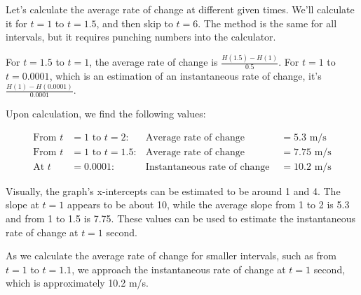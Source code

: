 \documentclass{article}
\begin{document}
\begin{itemize}
Let's calculate the average rate of change at different given times. We'll calculate it for \(t = 1\) to \(t = 1.5\), and then skip to \(t = 6\). The method is the same for all intervals, but it requires punching numbers into the calculator.

For \(t = 1.5\) to \(t = 1\), the average rate of change is \(\frac{H(1.5) - H(1)}{0.5}\). For \(t = 1\) to \(t = 0.0001\), which is an estimation of an instantaneous rate of change, it's \(\frac{H(1) - H(0.0001)}{0.0001}\).

Upon calculation, we find the following values:

\begin{align*}
\text{From } t &= 1 \text{ to } t = 2: & \text{Average rate of change } &= 5.3 \text{ m/s} \\
\text{From } t &= 1 \text{ to } t = 1.5: & \text{Average rate of change } &= 7.75 \text{ m/s} \\
\text{At } t &= 0.0001: & \text{Instantaneous rate of change } &= 10.2 \text{ m/s}
\end{align*}


Visually, the graph's x-intercepts can be estimated to be around 1 and 4. The slope at \(t = 1\) appears to be about 10, while the average slope from 1 to 2 is 5.3 and from 1 to 1.5 is 7.75. These values can be used to estimate the instantaneous rate of change at \(t = 1\) second.

As we calculate the average rate of change for smaller intervals, such as from \(t = 1\) to \(t = 1.1\), we approach the instantaneous rate of change at \(t = 1\) second, which is approximately 10.2 m/s.

\end{itemize}
\end{document}
